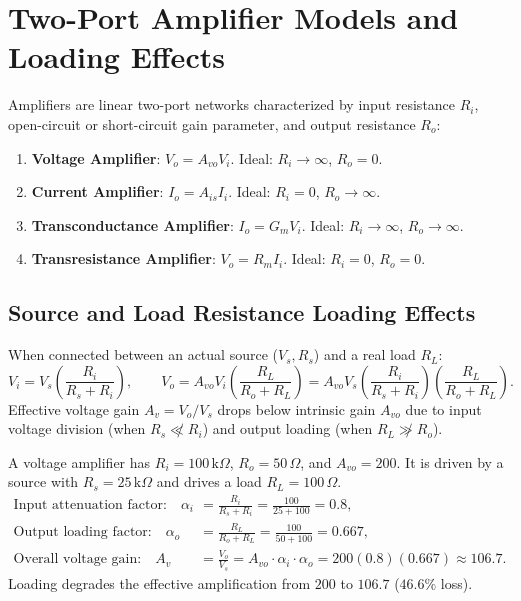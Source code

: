 \documentclass[12pt,a4paper]{article}
\begin{document}
\section{Two-Port Amplifier Models and Loading Effects}

\begin{tcolorbox}[defbox, title={The Four Fundamental Amplifier Models}]
Amplifiers are linear two-port networks characterized by input resistance $R_i$, open-circuit or short-circuit gain parameter, and output resistance $R_o$:
\begin{enumerate}[leftmargin=1.5em, itemsep=2pt]
  \item \textbf{Voltage Amplifier}: $V_o = A_{vo} V_i$. Ideal: $R_i \to \infty$, $R_o = 0$.
  \item \textbf{Current Amplifier}: $I_o = A_{is} I_i$. Ideal: $R_i = 0$, $R_o \to \infty$.
  \item \textbf{Transconductance Amplifier}: $I_o = G_m V_i$. Ideal: $R_i \to \infty$, $R_o \to \infty$.
  \item \textbf{Transresistance Amplifier}: $V_o = R_m I_i$. Ideal: $R_i = 0$, $R_o = 0$.
\end{enumerate}
\end{tcolorbox}

\subsection{Source and Load Resistance Loading Effects}
When connected between an actual source ($V_s, R_s$) and a real load $R_L$:
\[
V_i = V_s \left(\frac{R_i}{R_s + R_i}\right),\qquad
V_o = A_{vo} V_i \left(\frac{R_L}{R_o + R_L}\right) = A_{vo} V_s \left(\frac{R_i}{R_s + R_i}\right)\left(\frac{R_L}{R_o + R_L}\right).
\]
Effective voltage gain $A_v = V_o/V_s$ drops below intrinsic gain $A_{vo}$ due to input voltage division (when $R_s \not\ll R_i$) and output loading (when $R_L \not\gg R_o$).

\begin{tcolorbox}[examplebox, title={Amplifier Loading Effect Calculation}]
A voltage amplifier has $R_i = 100\,\mathrm{k}\Omega$, $R_o = 50\,\Omega$, and $A_{vo} = 200$. It is driven by a source with $R_s = 25\,\mathrm{k}\Omega$ and drives a load $R_L = 100\,\Omega$.
\[
\begin{aligned}
\text{Input attenuation factor:}\quad \alpha_i &= \frac{R_i}{R_s + R_i} = \frac{100}{25 + 100} = 0.8,\\
\text{Output loading factor:}\quad \alpha_o &= \frac{R_L}{R_o + R_L} = \frac{100}{50 + 100} = 0.667,\\
\text{Overall voltage gain:}\quad A_v &= \frac{V_o}{V_s} = A_{vo}\cdot\alpha_i\cdot\alpha_o = 200(0.8)(0.667) \approx 106.7.
\end{aligned}
\]
Loading degrades the effective amplification from $200$ to $106.7$ ($46.6\%$ loss).
\end{tcolorbox}
\end{document}
